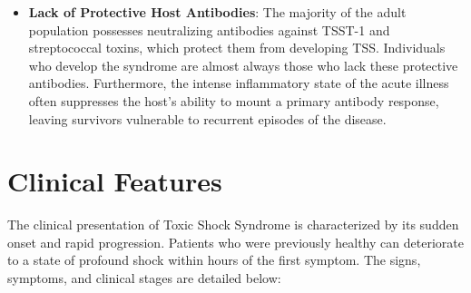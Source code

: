 \begin{itemize}
    \item \textbf{Lack of Protective Host Antibodies}: The majority of the adult population possesses neutralizing antibodies against TSST-1 and streptococcal toxins, which protect them from developing TSS. Individuals who develop the syndrome are almost always those who lack these protective antibodies. Furthermore, the intense inflammatory state of the acute illness often suppresses the host's ability to mount a primary antibody response, leaving survivors vulnerable to recurrent episodes of the disease.
\end{itemize}

\section*{Clinical Features}
The clinical presentation of Toxic Shock Syndrome is characterized by its sudden onset and rapid progression. Patients who were previously healthy can deteriorate to a state of profound shock within hours of the first symptom. The signs, symptoms, and clinical stages are detailed below:

